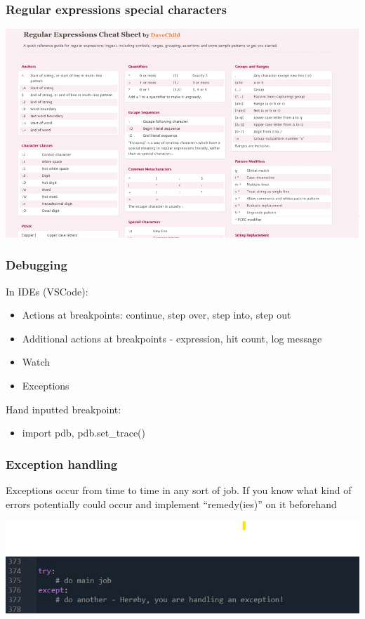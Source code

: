 \documentclass{beamer}
\begin{document}
\begin{frame}
    \frametitle{Regular expressions special characters}
            \centering
            \includegraphics[scale=0.5]{figures/regex.jpg}
\end{frame}

\begin{frame}
    \frametitle{Debugging}

In IDEs (VSCode):

    \begin{itemize}
        \item Actions at breakpoints: continue, step over, step into, step out
        \item Additional actions at breakpoints - expression, hit count, log message
        \item Watch
        \item Exceptions
    \end{itemize}

\vskip 2mm

Hand inputted breakpoint:

    \begin{itemize}
        \item import pdb, pdb.set\_trace()
    \end{itemize}
\end{frame}

\begin{frame}
    \frametitle{Exception handling}
    Exceptions occur from time to time in any sort of job. 
    If you know what kind of errors potentially could occur
    and implement “remedy(ies)” on it beforehand
        \begin{center}
            \includegraphics[scale=0.5]{figures/exception.jpg}
        \end{center}
\end{frame}
\end{document}
